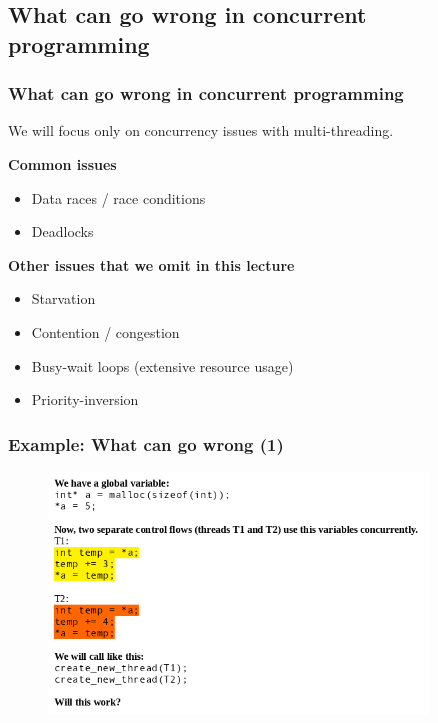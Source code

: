 \documentclass[xcolor={usenames,dvipsnames}]{beamer}
\begin{document}
%
%
%
\begin{frame}
\section{What can go wrong in concurrent programming}
\frametitle{What can go wrong in concurrent programming}
We will focus only on concurrency issues with multi-threading.\\\vspace{3mm}

\textbf{Common issues}
\begin{itemize}
\item Data races / race conditions
\item Deadlocks
\end{itemize}\vspace{3mm}

\textbf{Other issues that we omit in this lecture}
\begin{itemize}
\item Starvation
\item Contention / congestion
\item Busy-wait loops (extensive resource usage)
\item Priority-inversion
\end{itemize}

\end{frame}



%
%
%
\begin{frame}
\frametitle{Example: What can go wrong (1)}
\begin{figure}
\includegraphics[width=0.9\textwidth]{images/what-can-go-wrong-1.png}
\end{figure}
\end{frame}
\end{document}
